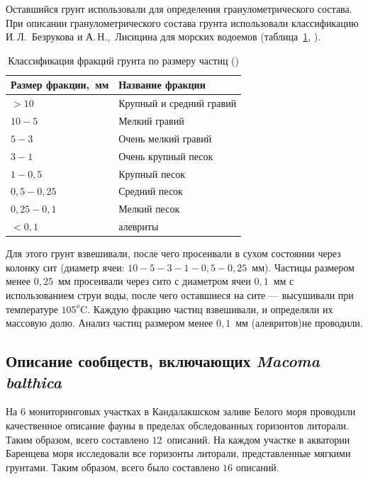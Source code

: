 Оставшийся грунт использовали для определения гранулометрического состава. 
При описании гранулометрического состава грунта использовали классификацию И.\,Л.~Безрукова и А.\,Н.,~Лисицина для морских водоемов (таблица~\ref{tab:lisicyn_granulometriya}, \cite{Bezrukov_Lisicyn_1960}).
\begin{table}[p]
    \centering
    \caption{Классификация фракций грунта по размеру частиц (\cite{Bezrukov_Lisicyn_1960})}
    \label{tab:lisicyn_granulometriya}
\begin{tabular}{|l|l|}
    \hline
    Размер фракции,~мм & Название фракции         \\ \hline
     $> 10$    & Крупный и средний гравий  \\
    $10-5$               & Мелкий гравий         \\
    $5-3$                & Очень мелкий гравий   \\
    $3-1$                & Очень крупный песок   \\
    $1-0,5$              & Крупный песок         \\
    $0,5-0,25$           & Средний песок         \\
    $0,25-0,1$           & Мелкий песок          \\
    $< 0,1$           & алевриты       \\\hline
\end{tabular}
\end{table}
Для этого грунт взвешивали, после чего просеивали в сухом состоянии через колонку сит (диаметр ячеи: $10 - 5 - 3 - 1 - 0,5 - 0,25$~мм). 
Частицы размером менее $0,25$~мм просеивали через сито с диаметром ячеи $0,1$~мм с использованием струи воды, после чего оставшиеся на сите --- высушивали при температуре $105^o$C. 
Каждую фракцию частиц взвешивали, и определяли их массовую долю. 
Анализ частиц размером менее $0,1$~мм (алевритов)не проводили. 

\afterpage{\clearpage}

    \subsection{Описание сообществ, включающих {\it Macoma balthica}}
На 6 мониторинговых участках в Кандалакшском заливе Белого моря проводили качественное описание фауны в пределах обследованных горизонтов литорали.
Таким образом, всего составлено $12$~описаний.
На каждом участке в акватории Баренцева моря исследовали все  горизонты литорали, представленные мягкими грунтами.  
Таким образом, всего было составлено $16$ описаний.

